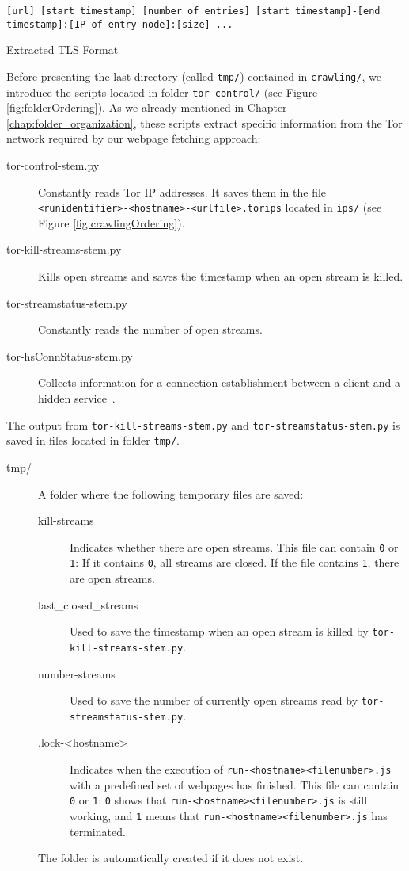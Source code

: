 \begin{listing}[t]
\begin{lstlisting}[basicstyle=\scriptsize\ttfamily,numbers=none]
[url] [start timestamp] [number of entries] [start timestamp]-[end timestamp]:[IP of entry node]:[size] ...
\end{lstlisting}
\caption{Extracted \ac{TLS} Format}
\label{lst:tlsextracteddata}
\end{listing}

Before presenting the last directory (called \texttt{tmp/}) contained in \texttt{crawling/}, we introduce the scripts located in folder \texttt{tor-control/} (see Figure \ref{fig:folderOrdering}). As we already mentioned in Chapter \ref{chap:folder_organization}, these scripts extract specific information from the Tor network required by our webpage fetching approach:
\begin{description}
\item[tor-control-stem.py] Constantly reads Tor \ac{IP} addresses. It saves them in the file \texttt{<runidentifier>-<hostname>-<urlfile>.torips} located in \texttt{ips/} (see Figure \ref{fig:crawlingOrdering}).
\item[tor-kill-streams-stem.py] Kills open streams and saves the timestamp when an open stream is killed.
\item[tor-streamstatus-stem.py] Constantly reads the number of open streams.
\item[tor-hsConnStatus-stem.py] Collects information for a connection establishment between a client and a hidden service~\cite{Mitseva2015}.
\end{description}
The output from \texttt{tor-kill-streams-stem.py} and \texttt{tor-streamstatus-stem.py} is saved in files located in folder \texttt{tmp/}.
\begin{description}
\item[tmp/] A folder where the following temporary files are saved:
\begin{description}
\item[kill-streams] Indicates whether there are open streams. This file can contain \texttt{0} or \texttt{1}: If it contains \texttt{0}, all streams are closed. If the file contains \texttt{1}, there are open streams.
\item[last\_closed\_streams] Used to save the timestamp when an open stream is killed by \texttt{tor-kill-streams-stem.py}.
\item[number-streams] Used to save the number of currently open streams read by \texttt{tor-streamstatus-stem.py}.
\item[.lock-<hostname>] Indicates when the execution of \texttt{run-<hostname><filenumber>.js} with a predefined set of webpages has finished. This file can contain \texttt{0} or \texttt{1}: \texttt{0} shows that \texttt{run-<hostname><filenumber>.js} is still working, and \texttt{1} means that \texttt{run-<hostname><filenumber>.js} has terminated.
\end{description}
The folder is automatically created if it does not exist.
\end{description}

